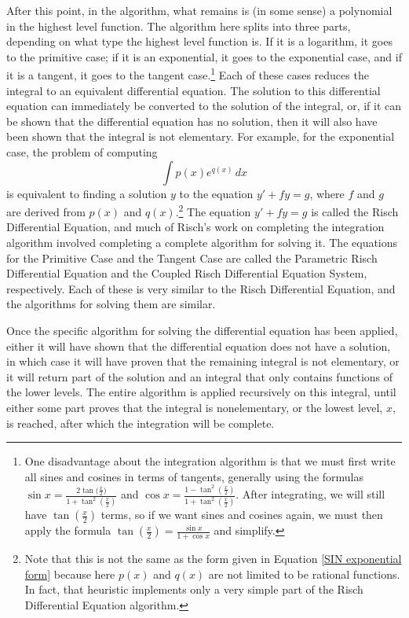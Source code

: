 After this point, in the algorithm, what remains is (in some sense) a
polynomial in the highest level function.  The algorithm here splits
into three parts, depending on what type the highest level function is.  If it
is a logarithm, it goes to the primitive case; if it is an exponential,
it goes to the exponential case, and if it is a tangent, it goes to the
tangent case.\footnote{One disadvantage about the \gls{integration} algorithm
is that we must first write all sines and cosines in terms of tangents,
generally using the formulas $\sin{x} = \frac{2\tan{(\frac{x}{2}})}{1 +
\tan^2{(\frac{x}{2})}}$ and $\cos{x} = \frac{1 -
\tan^2{(\frac{x}{2})}}{1 + \tan^2{(\frac{x}{2})}}$.  After integrating,
we will still have $\tan{(\frac{x}{2})}$ terms, so if we want sines and
cosines again, we must then apply the formula $\tan{(\frac{x}{2})} =
\frac{\sin{x}}{1 + \cos{x}}$ and simplify.}  Each of these cases
reduces the integral to an equivalent differential equation.  The
solution to this differential equation can immediately be converted to the
solution of the integral, or, if it can be shown that the differential
equation has no solution, then it will also have been shown that the
integral is not \gls{elementary}.  For example, for the exponential
case, the problem of computing
\begin{equation}
\label{exponential case}
\int{p(x)e^{q(x)}\,dx}
\end{equation}
is equivalent to finding a solution $y$ to the equation $y' + fy = g$,
where $f$ and $g$ are derived from $p(x)$ and $q(x)$.\footnote{Note that
this is not the same as the form given in Equation \ref{SIN exponential
form} because here $p(x)$ and $q(x)$ are not limited to be
\glspl{rational function}.  In fact, that heuristic implements only a
very simple part of the Risch Differential Equation algorithm.}  The
equation $y' + fy = g$ is called the Risch Differential Equation, and
much of Risch's work on completing the \gls{integration} algorithm
involved completing a complete algorithm for solving it.  The equations
for the Primitive Case and the Tangent Case are called the Parametric
Risch Differential Equation and the Coupled Risch Differential Equation
System, respectively.  Each of these is very similar to the Risch
Differential Equation, and the algorithms for solving them are similar.

Once the specific algorithm for solving the differential equation has
been applied, either it will have shown that the differential equation
does not have a solution, in which case it will have proven that the
remaining integral is not \gls{elementary}, or it will return part of
the solution and an integral that only contains functions of the lower
levels.  The entire algorithm is applied recursively on this integral,
until either some part proves that the integral is nonelementary, or the
lowest level, $x$, is reached, after which the \gls{integration} will be
complete.

